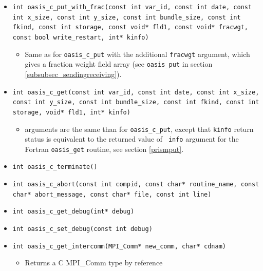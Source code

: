 \begin{itemize}
\vspace{0.2cm}
\item {\tt int oasis\_c\_put\_with\_frac(const int var\_id, const int date, const int x\_size, const int y\_size, const int bundle\_size, const int fkind, const int storage, const void* fld1, const void* fracwgt, const bool write\_restart, int* kinfo)}
  \begin{itemize}
  \item Same as for {\tt oasis\_c\_put} with the additional {\tt fracwgt} argument, which gives a fraction weight field array (see {\tt oasis\_put} in section \ref{subsubsec_sendingreceiving}). 
  \end{itemize}
\vspace{0.2cm}
\item {\tt int oasis\_c\_get(const int var\_id, const int date, const
  int x\_size, const int y\_size, const int bundle\_size, const int
  fkind, const int storage, void* fld1, int* kinfo)}
  \begin{itemize}
  \item arguments are the same than for {\tt oasis\_c\_put}, except that {\tt kinfo} return
  status is equivalent to the returned value of {\tt
  info} argument for the Fortran {\tt oasis\_get} routine, see section \ref{prismput}.
  \end{itemize}

\vspace{0.2cm}
\item {\tt int oasis\_c\_terminate()}

\vspace{0.2cm}
\item {\tt int oasis\_c\_abort(const int compid, const char* routine\_name, const char* abort\_message, const char* file, const int line)}

\vspace{0.2cm}
\item {\tt int oasis\_c\_get\_debug(int* debug)}

\vspace{0.2cm}
\item {\tt int oasis\_c\_set\_debug(const int debug)}

\vspace{0.2cm}
\item {\tt int oasis\_c\_get\_intercomm(MPI\_Comm* new\_comm, char* cdnam)}
  \begin{itemize}
  \item Returns a C MPI\_Comm type by reference
  \end{itemize}


\end{itemize}
